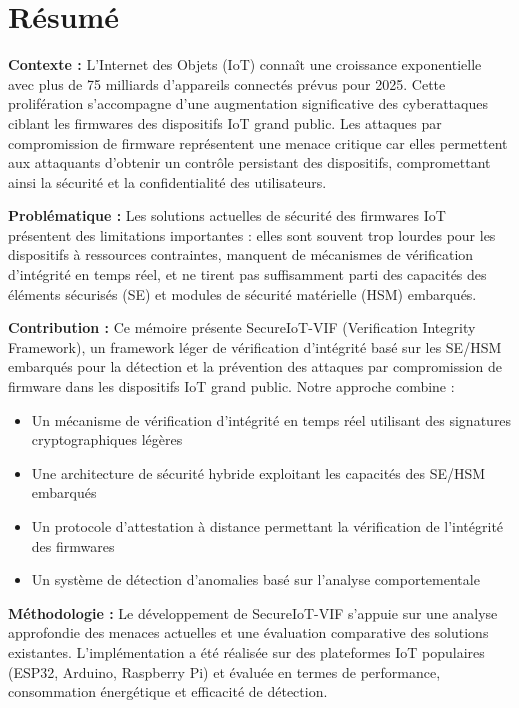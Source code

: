 
\chapter*{Résumé}

\textbf{Contexte :} L'Internet des Objets (IoT) connaît une croissance exponentielle avec plus de 75 milliards d'appareils connectés prévus pour 2025. Cette prolifération s'accompagne d'une augmentation significative des cyberattaques ciblant les firmwares des dispositifs IoT grand public. Les attaques par compromission de firmware représentent une menace critique car elles permettent aux attaquants d'obtenir un contrôle persistant des dispositifs, compromettant ainsi la sécurité et la confidentialité des utilisateurs.

\textbf{Problématique :} Les solutions actuelles de sécurité des firmwares IoT présentent des limitations importantes : elles sont souvent trop lourdes pour les dispositifs à ressources contraintes, manquent de mécanismes de vérification d'intégrité en temps réel, et ne tirent pas suffisamment parti des capacités des éléments sécurisés (SE) et modules de sécurité matérielle (HSM) embarqués.

\textbf{Contribution :} Ce mémoire présente SecureIoT-VIF (Verification Integrity Framework), un framework léger de vérification d'intégrité basé sur les SE/HSM embarqués pour la détection et la prévention des attaques par compromission de firmware dans les dispositifs IoT grand public. Notre approche combine :

\begin{itemize}
    \item Un mécanisme de vérification d'intégrité en temps réel utilisant des signatures cryptographiques légères
    \item Une architecture de sécurité hybride exploitant les capacités des SE/HSM embarqués
    \item Un protocole d'attestation à distance permettant la vérification de l'intégrité des firmwares
    \item Un système de détection d'anomalies basé sur l'analyse comportementale
\end{itemize}

\textbf{Méthodologie :} Le développement de SecureIoT-VIF s'appuie sur une analyse approfondie des menaces actuelles et une évaluation comparative des solutions existantes. L'implémentation a été réalisée sur des plateformes IoT populaires (ESP32, Arduino, Raspberry Pi) et évaluée en termes de performance, consommation énergétique et efficacité de détection.

